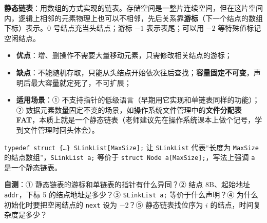 \documentclass[10.5pt,a4paper,oneside]{article}
\newcommand{\hlred}[1]{\textcolor{wdred}{\bfseries #1}}
\providecommand{\tightlist}{\setlength{\itemsep}{2pt}\setlength{\parskip}{0pt}}
\begin{document}
\begin{summarybox}

\textbf{静态链表}：用数组的方式实现的链表。存储空间是一整片连续空间，但在这片空间内，逻辑上相邻的元素物理上也可以不相邻，先后关系靠\textbf{游标}（下一个结点的数组下标）表示。0
号结点充当头结点；游标 \(-1\) 表示表尾；可以用 \(-2\)
等特殊值标记空闲结点。

\begin{itemize}
\tightlist
\item
  \textbf{优点}：增、删操作不需要大量移动元素，只需修改相关结点的游标；
\item
  \textbf{缺点}：不能随机存取，只能从头结点开始依次往后查找；\hlred{容量固定不可变}，声明后最大容量就定死了，不可扩展；
\item
  \textbf{适用场景}：①
  不支持指针的低级语言（早期用它实现和单链表同样的功能）；②
  数据元素数量固定不变的场景，如操作系统文件管理中的\textbf{文件分配表
  FAT}，本质上就是一个静态链表（老师建议先在操作系统课本上做个记号，学到文件管理时回头体会）。
\end{itemize}

\texttt{typedef\ struct\ \{…\}\ SLinkList{[}MaxSize{]};} 让
\texttt{SLinkList} 代表“长度为 \texttt{MaxSize}
的结点数组”，\texttt{SLinkList\ a;} 等价于
\texttt{struct\ Node\ a{[}MaxSize{]};}，写法上强调 \texttt{a}
是一个静态链表。

\textbf{自测}：① 静态链表的游标和单链表的指针有什么异同？② 结点
8B、起始地址 \texttt{addr}，下标 5 的结点地址是多少？③
\texttt{SLinkList\ a;} 等价于什么声明？④ 为什么初始化时要把空闲结点的
\texttt{next} 设为 \(-2\)？⑤ 静态链表找位序为 \(i\)
的结点，时间复杂度是多少？

\end{summarybox}
\end{document}
